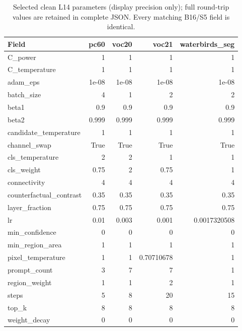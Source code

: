 \begin{table}[htbp]
\centering\scriptsize
\caption{Selected clean L14 parameters (display precision only); full round-trip values are retained in complete JSON. Every matching B16/S5 field is identical.}
\label{tab:params1}
\setlength{\tabcolsep}{4pt}
\begin{tabular}{lrrrr}
\toprule
Field & pc60 & voc20 & voc21 & waterbirds\_seg \\
\midrule
C\_power & 1 & 1 & 1 & 1 \\
C\_temperature & 1 & 1 & 1 & 1 \\
adam\_eps & 1e-08 & 1e-08 & 1e-08 & 1e-08 \\
batch\_size & 4 & 1 & 2 & 2 \\
beta1 & 0.9 & 0.9 & 0.9 & 0.9 \\
beta2 & 0.999 & 0.999 & 0.999 & 0.999 \\
candidate\_temperature & 1 & 1 & 1 & 1 \\
channel\_swap & True & True & True & True \\
cls\_temperature & 2 & 2 & 1 & 1 \\
cls\_weight & 0.75 & 2 & 0.75 & 1 \\
connectivity & 4 & 4 & 4 & 4 \\
counterfactual\_contrast & 0.35 & 0.35 & 0.35 & 0.35 \\
layer\_fraction & 0.75 & 0.75 & 0.75 & 0.75 \\
lr & 0.01 & 0.003 & 0.001 & 0.0017320508 \\
min\_confidence & 0 & 0 & 0 & 0 \\
min\_region\_area & 1 & 1 & 1 & 1 \\
pixel\_temperature & 1 & 1 & 0.70710678 & 1 \\
prompt\_count & 3 & 7 & 7 & 1 \\
region\_weight & 1 & 1 & 2 & 1 \\
steps & 5 & 8 & 20 & 15 \\
top\_k & 8 & 8 & 8 & 8 \\
weight\_decay & 0 & 0 & 0 & 0 \\
\bottomrule
\end{tabular}
\end{table}
